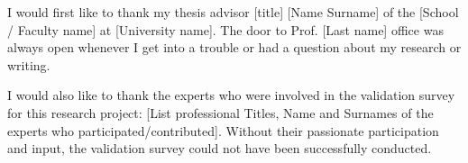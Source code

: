 \justifying
I would first like to thank my thesis advisor [title] [Name Surname] of the [School / Faculty name] at [University name]. The door to Prof. [Last name] office was always open whenever I get into a trouble or had a question about my research or writing. 

I would also like to thank the experts who were involved in the validation survey for this research project: [List professional Titles, Name and Surnames of the experts who participated/contributed]. Without their passionate participation and input, the validation survey could not have been successfully conducted.